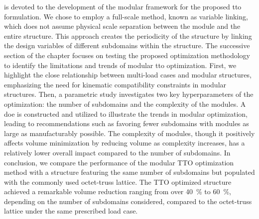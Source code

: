  is devoted to the development of the modular framework for the proposed \gls{tto} formulation. We chose to employ a full-scale method, known as variable linking, which does not assume physical scale separation between the module and the entire structure. This approach creates the periodicity of the structure by linking the design variables of different subdomains within the structure. The successive section of the chapter focuses on testing the proposed optimization methodology to identify the limitations and trends of modular \gls{tto} optimization. First, we highlight the close relationship between multi-load cases and modular structures, emphasizing the need for kinematic compatibility constraints in modular structures. Then, a parametric study investigates two key hyperparameters of the optimization: the number of subdomains and the complexity of the modules. A \gls{doe} is constructed and utilized to illustrate the trends in modular optimization, leading to recommendations such as favoring fewer subdomains with modules as large as manufacturably possible. The complexity of modules, though it positively affects volume minimization by reducing volume as complexity increases, has a relatively lower overall impact compared to the number of subdomains.  In conclusion, we compare the performance of the modular TTO optimization method with a structure featuring the same number of subdomains but populated with the commonly used octet-truss lattice. The TTO optimized structure achieved a remarkable volume reduction ranging from over \qty{40}{\%} to \qty{60}{\%}, depending on the number of subdomains considered, compared to the octet-truss lattice under the same prescribed load case.

